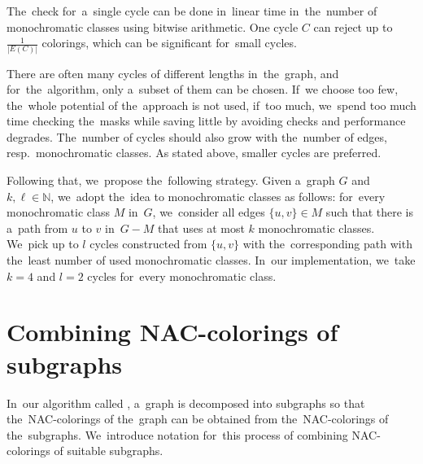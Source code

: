 The~check for~a~single cycle can be done in~linear time
in~the~number of monochromatic classes using bitwise arithmetic.
One cycle $C$ can reject up to $\frac{1}{|E(C)|}$ colorings,
which can be significant for~small cycles.

There are often many cycles of different lengths in~the~graph,
and for~the~algorithm, only a~subset of them can be chosen.
If~we choose too few, the~whole potential of the~approach is not used, if~too much,
we~spend too much time checking the~masks while saving little
by avoiding \IsNACColoring{} checks and performance degrades.
The~number of cycles should also grow with the~number of edges,
resp.\ monochromatic classes.
As stated above, smaller cycles are preferred.

Following that, we~propose the~following strategy.
Given a~graph $G$ and $k,\ell\in \mathbb{N}$,
we~adopt the~idea to monochromatic classes as follows:
for~every monochromatic class $M$ in~$G$,
we~consider all edges $\{u, v\} \in M$ such that there is a~path from $u$ to $v$
in~$G - M$ that uses at most $k$ monochromatic classes.
We~pick up to $l$ cycles constructed from $\{u, v\}$ with the~corresponding
path with the~least number of used monochromatic classes.
In~our implementation, we~take $k=4$ and $l=2$ cycles for~every monochromatic class.

\section{Combining NAC-colorings of subgraphs}%
\label{sec:combining}

In~our algorithm called \Subgraphs{}, a~graph is decomposed into subgraphs so that
the~NAC-colorings of the~graph can be obtained from the~NAC-colorings of the~subgraphs.
We~introduce notation for~this process of combining NAC-colorings of suitable subgraphs.


